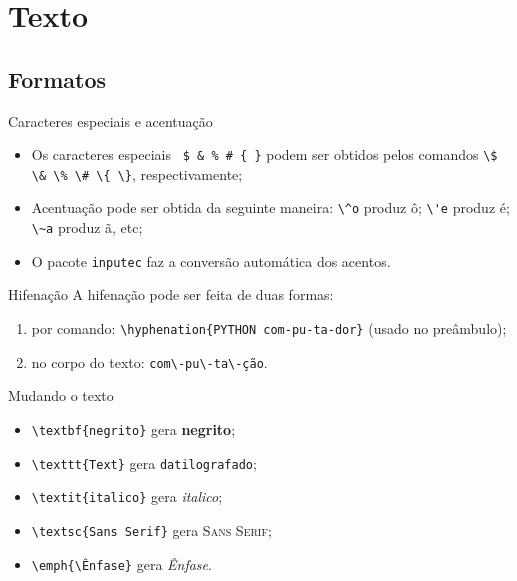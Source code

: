 \section{Texto}
\subsection{Formatos}

\begin{frame}[fragile]{Caracteres especiais e acentua{\c c}\~ao}
\begin{itemize}
\item Os caracteres especiais \verb| $ & % # { }| podem ser obtidos pelos comandos \verb|\$ \& \% \# \{ \}|, respectivamente;
\item Acentua{\c c}\~ao pode ser obtida da seguinte maneira: \verb|\^o| produz \^o; \verb|\'e| produz \'e; \verb|\~a| produz \~a, etc;
\item O pacote \texttt{inputec} faz a convers\~ao autom\'atica dos acentos.
\end{itemize}
\end{frame}


\begin{frame}[fragile]{Hifena{\c c}\~ao}
A hifena{\c c}\~ao pode ser feita de duas formas:
\begin{enumerate}
\item por comando: \verb|\hyphenation{PYTHON com-pu-ta-dor}| (usado no pre\^ambulo);
\item no corpo do texto: \verb|com\-pu\-ta\-ção|.
\end{enumerate}
\end{frame}


\begin{frame}[fragile]{Mudando o texto}
\begin{itemize}
\item \verb|\textbf{negrito}| gera \textbf{negrito};
\item \verb|\texttt{Text}| gera \texttt{datilografado};
\item \verb|\textit{italico}| gera \textit{italico};
\item \verb|\textsc{Sans Serif}| gera \textsc{Sans Serif};
\item \verb|\emph{\Ênfase}| gera \emph{\^Enfase}.
\end{itemize}
\end{frame}


